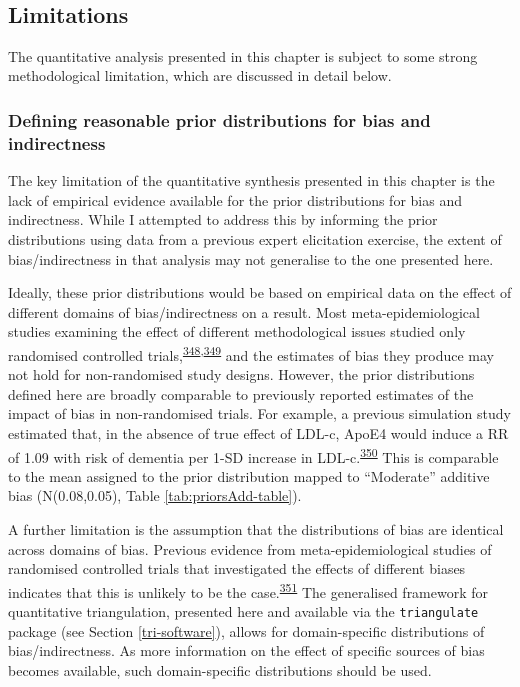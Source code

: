 \documentclass[a4paper, twoside]{templates/ociamthesis}
\begin{document}
~

\hypertarget{limitations-2}{%
\subsection{Limitations}\label{limitations-2}}

The quantitative analysis presented in this chapter is subject to some strong methodological limitation, which are discussed in detail below.

\hypertarget{defining-reasonable-prior-distributions-for-bias-and-indirectness}{%
\subsubsection{Defining reasonable prior distributions for bias and indirectness}\label{defining-reasonable-prior-distributions-for-bias-and-indirectness}}

The key limitation of the quantitative synthesis presented in this chapter is the lack of empirical evidence available for the prior distributions for bias and indirectness. While I attempted to address this by informing the prior distributions using data from a previous expert elicitation exercise, the extent of bias/indirectness in that analysis may not generalise to the one presented here.

Ideally, these prior distributions would be based on empirical data on the effect of different domains of bias/indirectness on a result. Most meta-epidemiological studies examining the effect of different methodological issues studied only randomised controlled trials,\textsuperscript{\protect\hyperlink{ref-amer2021}{348},\protect\hyperlink{ref-page2016}{349}} and the estimates of bias they produce may not hold for non-randomised study designs. However, the prior distributions defined here are broadly comparable to previously reported estimates of the impact of bias in non-randomised trials. For example, a previous simulation study estimated that, in the absence of true effect of LDL-c, ApoE4 would induce a RR of 1.09 with risk of dementia per 1-SD increase in LDL-c.\textsuperscript{\protect\hyperlink{ref-iwagami2021}{350}} This is comparable to the mean assigned to the prior distribution mapped to ``Moderate'' additive bias (N(0.08,0.05), Table \ref{tab:priorsAdd-table}).

A further limitation is the assumption that the distributions of bias are identical across domains of bias. Previous evidence from meta-epidemiological studies of randomised controlled trials that investigated the effects of different biases indicates that this is unlikely to be the case.\textsuperscript{\protect\hyperlink{ref-savovic2018}{351}} The generalised framework for quantitative triangulation, presented here and available via the \texttt{triangulate} package (see Section \ref{tri-software}), allows for domain-specific distributions of bias/indirectness. As more information on the effect of specific sources of bias becomes available, such domain-specific distributions should be used.
\end{document}

